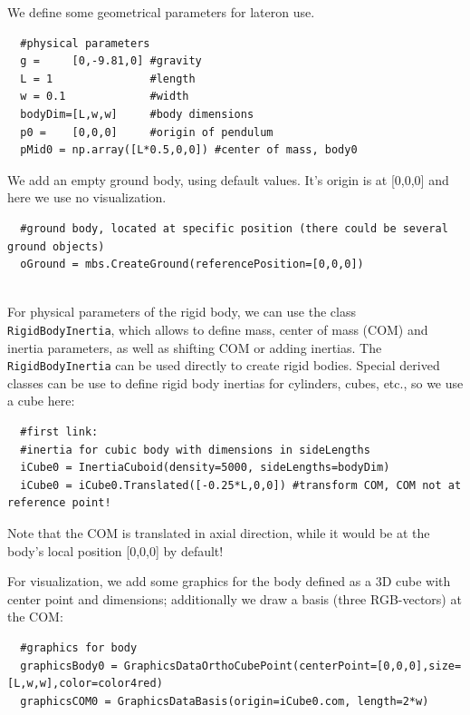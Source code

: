 \noindent We define some geometrical parameters for lateron use.
\pythonstyle\begin{lstlisting}
  #physical parameters
  g =     [0,-9.81,0] #gravity
  L = 1               #length
  w = 0.1             #width
  bodyDim=[L,w,w]     #body dimensions
  p0 =    [0,0,0]     #origin of pendulum
  pMid0 = np.array([L*0.5,0,0]) #center of mass, body0
\end{lstlisting}

\noindent We add an empty ground body, using default values. It's origin is at [0,0,0] and here we use no visualization.
\pythonstyle\begin{lstlisting}
  #ground body, located at specific position (there could be several ground objects)
  oGround = mbs.CreateGround(referencePosition=[0,0,0])
\end{lstlisting}

\horizontalRuler\\
\noindent For physical parameters of the rigid body, we can use the class \texttt{RigidBodyInertia}, which allows to define mass, center of mass (COM) and inertia parameters, as well as shifting COM or adding inertias.
The \texttt{RigidBodyInertia} can be used directly to create rigid bodies. Special derived classes can be use to define rigid body inertias for cylinders, cubes, etc., so we use a cube here:
\pythonstyle\begin{lstlisting}
  #first link:
  #inertia for cubic body with dimensions in sideLengths
  iCube0 = InertiaCuboid(density=5000, sideLengths=bodyDim)
  iCube0 = iCube0.Translated([-0.25*L,0,0]) #transform COM, COM not at reference point!
\end{lstlisting}
Note that the COM is translated in axial direction, while it would be at the body's local position [0,0,0] by default!

\noindent For visualization, we add some graphics for the body defined as a 3D cube with center point and dimensions; additionally we draw a basis (three RGB-vectors) at the COM:
\pythonstyle\begin{lstlisting}
  #graphics for body
  graphicsBody0 = GraphicsDataOrthoCubePoint(centerPoint=[0,0,0],size=[L,w,w],color=color4red)
  graphicsCOM0 = GraphicsDataBasis(origin=iCube0.com, length=2*w)
\end{lstlisting}


